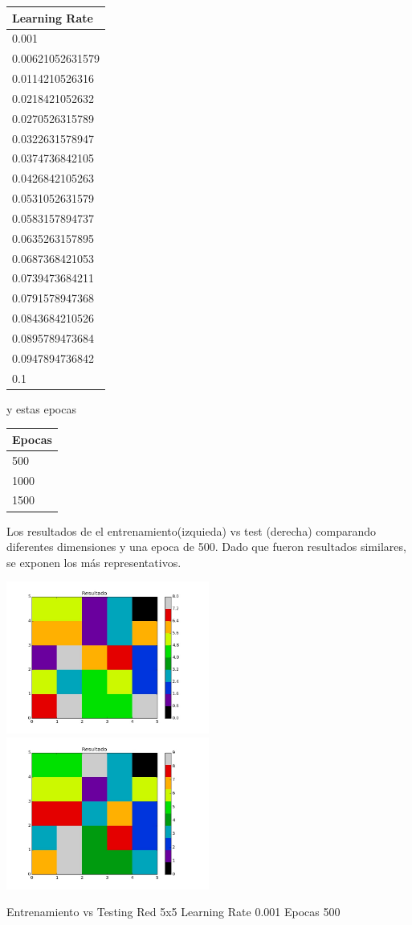\begin{tabular}{|l|}
\hline
Learning Rate \\ \hline
0.001              \\ \hline
0.00621052631579 \\ \hline
0.0114210526316 \\ \hline
0.0218421052632 \\ \hline
0.0270526315789 \\ \hline
0.0322631578947	 \\ \hline
0.0374736842105	 \\ \hline
0.0426842105263	 \\ \hline
0.0531052631579	 \\ \hline
0.0583157894737	 \\ \hline
0.0635263157895	 \\ \hline
0.0687368421053	 \\ \hline
0.0739473684211	 \\ \hline
0.0791578947368	 \\ \hline
0.0843684210526	 \\ \hline
0.0895789473684	 \\ \hline
0.0947894736842	 \\ \hline
0.1 \\ \hline

\end{tabular}
y estas epocas
\begin{tabular}{|l|}
\hline
Epocas\\ \hline
500 \\ \hline
1000 \\ \hline
1500 \\ \hline
\end{tabular}

Los resultados de el entrenamiento(izquieda) vs test (derecha) comparando diferentes dimensiones y una epoca de 500. Dado que fueron resultados similares, se exponen los m\'as representativos.

\includegraphics[width=0.5\textwidth]{img/ej2_train_M_5_lrate_001_epocas_500}
\includegraphics[width=0.5\textwidth]{img/ej2_test_M_5_lrate_001_epocas_500}
{\footnotesize Entrenamiento vs Testing Red 5x5 Learning Rate 0.001 Epocas 500\par}

